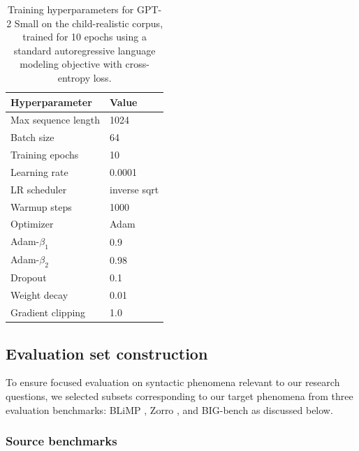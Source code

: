 \begin{table}[ht]
\centering
\small
\vspace{8pt}
\caption{Training hyperparameters for GPT-2 Small on the child-realistic corpus, trained for 10 epochs using a standard autoregressive language modeling objective with cross-entropy loss.}
\label{tab:training_hyperparameters}
\setlength{\tabcolsep}{4pt}
\renewcommand{\arraystretch}{1.1}
\begin{tabular}{@{}ll@{}}
\toprule
\textbf{Hyperparameter} & \textbf{Value} \\
\midrule
Max sequence length & 1024         \\
Batch size          & 64           \\
Training epochs     & 10           \\
Learning rate       & 0.0001       \\
LR scheduler        & inverse sqrt \\
Warmup steps        & 1000         \\
Optimizer           & Adam         \\
Adam-$\beta_1$      & 0.9          \\
Adam-$\beta_2$      & 0.98         \\
Dropout             & 0.1          \\
Weight decay        & 0.01         \\
Gradient clipping   & 1.0          \\
\bottomrule
\end{tabular}
\end{table}


\subsection{Evaluation set construction}
\label{app:subset_selection}

To ensure focused evaluation on syntactic phenomena relevant to our research questions, we selected subsets corresponding to our target phenomena from three evaluation benchmarks: BLiMP \citep{warstadt2020blimp}, Zorro \citep{huebner2021babyberta}, and BIG-bench \citep{srivastava2023beyond} as discussed below.

\subsubsection{Source benchmarks}

